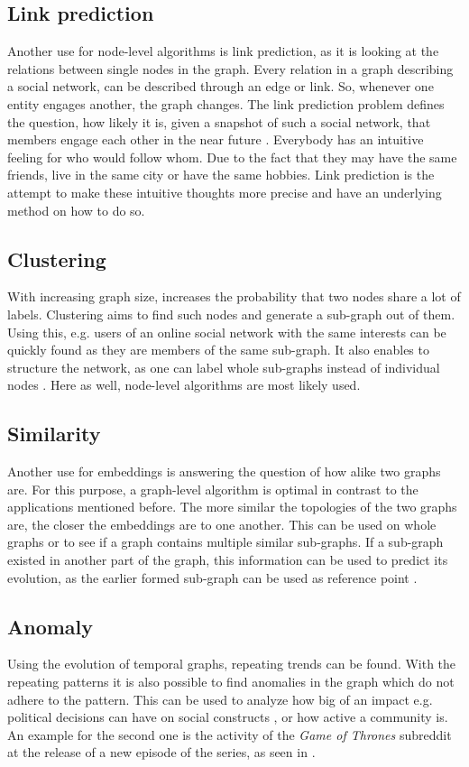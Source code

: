 \documentclass[sigconf]{acmart}
\begin{document}
\subsection{Link prediction}
Another use for node-level algorithms is link prediction, as it is looking at the relations between single nodes in the graph.
Every relation in a graph describing a social network, can be described  through an edge or link. So, whenever one entity engages another, the graph changes.
The link prediction problem defines the question, how likely it is, given a snapshot of such a social network, that members engage each other in the near future \cite{LibenNowell.op.2003}.
Everybody has an intuitive feeling for who would follow whom. Due to the fact that they may have the same friends, live in the same city or have the same hobbies. 
Link prediction is the attempt to make these intuitive thoughts more precise and have an underlying method on how to do so.

\subsection{Clustering}
With increasing graph size, increases the probability that two nodes share a lot of labels. 
Clustering aims to find such nodes and generate a sub-graph out of them. Using this, e.g. users of an online social network with the same interests can be quickly found as they are members of the same sub-graph.
It also enables to structure the network, as one can label whole sub-graphs instead of individual nodes \cite{Ding.2001}. Here as well, node-level algorithms are most likely used. 

\subsection{Similarity}
Another use for embeddings is answering the question of how alike two graphs are. For this purpose, a graph-level algorithm is optimal in contrast to the applications mentioned before. The more similar the topologies of the two graphs are, the closer the embeddings are to one another. This can be used on whole graphs or to see if a graph
contains multiple similar sub-graphs. If a sub-graph existed in another part of the graph, this information can be used to predict its evolution, as the earlier formed sub-graph can be used as reference point \cite{Beladev.2020}.

\subsection{Anomaly}
Using the evolution of temporal graphs, repeating trends can be found. With the repeating patterns it is also possible to find anomalies in the graph which do not adhere to the pattern.
This can be used to analyze how big of an impact e.g. political decisions can have on social constructs \cite{Beladev.2020}, or how active a community is. An example for the second one is 
the activity of the \emph{Game of Thrones} subreddit at the release of a new episode of the series, as seen in \cite{Beladev.2020}. 
\end{document}
